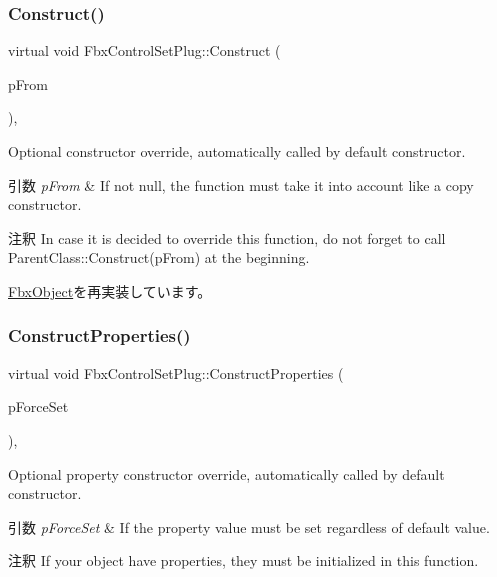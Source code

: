 \subsubsection{\texorpdfstring{Construct()}{Construct()}}
{\footnotesize\ttfamily virtual void Fbx\+Control\+Set\+Plug\+::\+Construct (\begin{DoxyParamCaption}\item[{const \hyperlink{class_fbx_object}{Fbx\+Object} $\ast$}]{p\+From }\end{DoxyParamCaption})\hspace{0.3cm}{\ttfamily [protected]}, {\ttfamily [virtual]}}

Optional constructor override, automatically called by default constructor. 
\begin{DoxyParams}{引数}
{\em p\+From} & If not null, the function must take it into account like a copy constructor. \\
\hline
\end{DoxyParams}
\begin{DoxyRemark}{注釈}
In case it is decided to override this function, do not forget to call Parent\+Class\+::\+Construct(p\+From) at the beginning. 
\end{DoxyRemark}


\hyperlink{class_fbx_object_a313503bc645af3fdceb4a99ef5cea7eb}{Fbx\+Object}を再実装しています。

\mbox{\label{class_fbx_control_set_plug_a9551bc59f788d2b0e44b7b8ba31188a6}} 
\subsubsection{\texorpdfstring{Construct\+Properties()}{ConstructProperties()}}
{\footnotesize\ttfamily virtual void Fbx\+Control\+Set\+Plug\+::\+Construct\+Properties (\begin{DoxyParamCaption}\item[{bool}]{p\+Force\+Set }\end{DoxyParamCaption})\hspace{0.3cm}{\ttfamily [protected]}, {\ttfamily [virtual]}}

Optional property constructor override, automatically called by default constructor. 
\begin{DoxyParams}{引数}
{\em p\+Force\+Set} & If the property value must be set regardless of default value. \\
\hline
\end{DoxyParams}
\begin{DoxyRemark}{注釈}
If your object have properties, they must be initialized in this function. 
\end{DoxyRemark}


